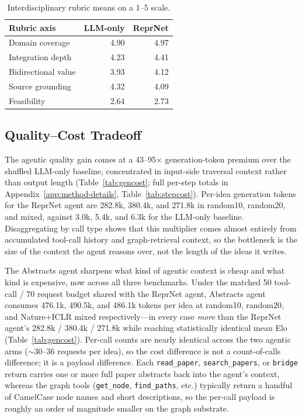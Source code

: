 \documentclass[10pt,twocolumn]{article}
\begin{document}
\begin{table}[t]
\centering
\small
\begin{tabular}{lrr}
\toprule
Rubric axis & LLM-only & ReprNet \\
\midrule
Domain coverage & 4.90 & 4.97 \\
Integration depth & 4.23 & 4.41 \\
Bidirectional value & 3.93 & 4.12 \\
Source grounding & 4.32 & 4.09 \\
Feasibility & 2.64 & 2.73 \\
\bottomrule
\end{tabular}
\caption{Interdisciplinary rubric means on a 1--5 scale.}
\label{tab:rubric}
\end{table}

\subsection{Quality--Cost Tradeoff}

The agentic quality gain comes at a 43--95$\times$ generation-token
premium over the shuffled LLM-only baseline, concentrated in input-side
traversal context rather than output length (Table~\ref{tab:gencost}; full per-step totals in
Appendix~\ref{app:method-details}, Table~\ref{tab:stepcost}).
Per-idea generation tokens for the ReprNet agent are 282.8k, 380.4k, and
271.8k in random10, random20, and mixed, against 3.0k, 5.4k, and 6.3k
for the LLM-only baseline.  Disaggregating by call type shows that this
multiplier comes almost entirely from accumulated tool-call history and
graph-retrieval context, so the bottleneck is the size of the context
the agent reasons over, not the length of the ideas it writes.

The Abstracts agent sharpens what kind of agentic context is cheap and
what kind is expensive, now across all three benchmarks.  Under the
matched 50 tool-call / 70 request budget shared with the ReprNet agent,
Abstracts agent consumes 476.1k, 490.5k, and 486.1k tokens per idea at
random10, random20, and Nature+ICLR mixed respectively---in every case
\emph{more} than the ReprNet agent's 282.8k / 380.4k / 271.8k while
reaching statistically identical mean Elo (Table~\ref{tab:gencost}).
Per-call counts are nearly identical across the two agentic arms
($\sim 30$--$36$ requests per idea), so the cost difference is not a
count-of-calls difference; it is a payload difference.  Each
\texttt{read\_paper}, \texttt{search\_papers}, or \texttt{bridge}
return carries one or more full paper abstracts back into the agent's
context, whereas the graph tools (\texttt{get\_node},
\texttt{find\_paths}, etc.) typically return a handful of CamelCase
node names and short descriptions, so the per-call payload is roughly
an order of magnitude smaller on the graph substrate.
\end{document}

